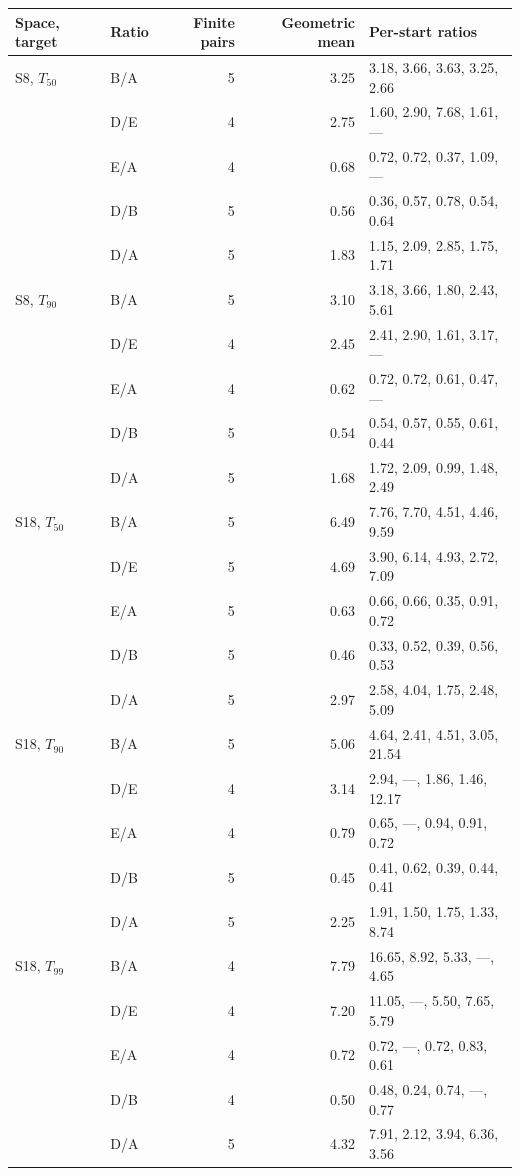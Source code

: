\begin{tabular}{llrrl}\toprule
Space, target & Ratio & Finite pairs & Geometric mean & Per-start ratios\\\midrule
S8, $T_{50}$ & B/A & 5 & 3.25 & 3.18, 3.66, 3.63, 3.25, 2.66\\
 & D/E & 4 & 2.75 & 1.60, 2.90, 7.68, 1.61, ---\\
 & E/A & 4 & 0.68 & 0.72, 0.72, 0.37, 1.09, ---\\
 & D/B & 5 & 0.56 & 0.36, 0.57, 0.78, 0.54, 0.64\\
 & D/A & 5 & 1.83 & 1.15, 2.09, 2.85, 1.75, 1.71\\
\addlinespace
S8, $T_{90}$ & B/A & 5 & 3.10 & 3.18, 3.66, 1.80, 2.43, 5.61\\
 & D/E & 4 & 2.45 & 2.41, 2.90, 1.61, 3.17, ---\\
 & E/A & 4 & 0.62 & 0.72, 0.72, 0.61, 0.47, ---\\
 & D/B & 5 & 0.54 & 0.54, 0.57, 0.55, 0.61, 0.44\\
 & D/A & 5 & 1.68 & 1.72, 2.09, 0.99, 1.48, 2.49\\
\addlinespace
S18, $T_{50}$ & B/A & 5 & 6.49 & 7.76, 7.70, 4.51, 4.46, 9.59\\
 & D/E & 5 & 4.69 & 3.90, 6.14, 4.93, 2.72, 7.09\\
 & E/A & 5 & 0.63 & 0.66, 0.66, 0.35, 0.91, 0.72\\
 & D/B & 5 & 0.46 & 0.33, 0.52, 0.39, 0.56, 0.53\\
 & D/A & 5 & 2.97 & 2.58, 4.04, 1.75, 2.48, 5.09\\
\addlinespace
S18, $T_{90}$ & B/A & 5 & 5.06 & 4.64, 2.41, 4.51, 3.05, 21.54\\
 & D/E & 4 & 3.14 & 2.94, ---, 1.86, 1.46, 12.17\\
 & E/A & 4 & 0.79 & 0.65, ---, 0.94, 0.91, 0.72\\
 & D/B & 5 & 0.45 & 0.41, 0.62, 0.39, 0.44, 0.41\\
 & D/A & 5 & 2.25 & 1.91, 1.50, 1.75, 1.33, 8.74\\
\addlinespace
S18, $T_{99}$ & B/A & 4 & 7.79 & 16.65, 8.92, 5.33, ---, 4.65\\
 & D/E & 4 & 7.20 & 11.05, ---, 5.50, 7.65, 5.79\\
 & E/A & 4 & 0.72 & 0.72, ---, 0.72, 0.83, 0.61\\
 & D/B & 4 & 0.50 & 0.48, 0.24, 0.74, ---, 0.77\\
 & D/A & 5 & 4.32 & 7.91, 2.12, 3.94, 6.36, 3.56\\
\bottomrule\end{tabular}
